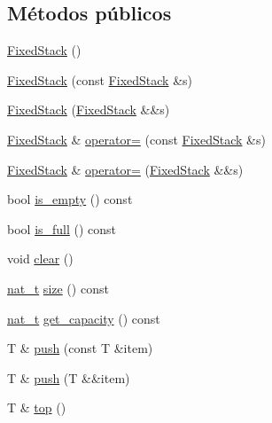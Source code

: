 \subsection*{Métodos públicos}
\begin{DoxyCompactItemize}
\item 
\hyperlink{class_designar_1_1_fixed_stack_a0c590a0c0a634d22c71234023f85dc2e}{Fixed\+Stack} ()
\item 
\hyperlink{class_designar_1_1_fixed_stack_a07e80411f9dbbc5009846ffd9f614b3c}{Fixed\+Stack} (const \hyperlink{class_designar_1_1_fixed_stack}{Fixed\+Stack} \&s)
\item 
\hyperlink{class_designar_1_1_fixed_stack_aa2a2a6d0c92619bc8404c6c0fd5962c7}{Fixed\+Stack} (\hyperlink{class_designar_1_1_fixed_stack}{Fixed\+Stack} \&\&s)
\item 
\hyperlink{class_designar_1_1_fixed_stack}{Fixed\+Stack} \& \hyperlink{class_designar_1_1_fixed_stack_a3176c9be0f7199ed6708b3e0aca9d8a5}{operator=} (const \hyperlink{class_designar_1_1_fixed_stack}{Fixed\+Stack} \&s)
\item 
\hyperlink{class_designar_1_1_fixed_stack}{Fixed\+Stack} \& \hyperlink{class_designar_1_1_fixed_stack_a300a79d1d3821297d058228cb69f2747}{operator=} (\hyperlink{class_designar_1_1_fixed_stack}{Fixed\+Stack} \&\&s)
\item 
bool \hyperlink{class_designar_1_1_fixed_stack_a59e1c93e8653984ac828840111914982}{is\+\_\+empty} () const
\item 
bool \hyperlink{class_designar_1_1_fixed_stack_ab008ea6214d2335d4fd1ac18fa05e0f1}{is\+\_\+full} () const
\item 
void \hyperlink{class_designar_1_1_fixed_stack_a63b4e0110ee9590eba7b2e776159eb17}{clear} ()
\item 
\hyperlink{namespace_designar_aa72662848b9f4815e7bf31a7cf3e33d1}{nat\+\_\+t} \hyperlink{class_designar_1_1_fixed_stack_a89fc7e6df53ecefa9197a63aeb17e1d0}{size} () const
\item 
\hyperlink{namespace_designar_aa72662848b9f4815e7bf31a7cf3e33d1}{nat\+\_\+t} \hyperlink{class_designar_1_1_fixed_stack_a617775aac061d6a003c7e1638e3e82bb}{get\+\_\+capacity} () const
\item 
T \& \hyperlink{class_designar_1_1_fixed_stack_a2c6786c06798604aaa851e0589c7ba75}{push} (const T \&item)
\item 
T \& \hyperlink{class_designar_1_1_fixed_stack_ac41dfc3fd83bc3b0176e37dcfd600f70}{push} (T \&\&item)
\item 
T \& \hyperlink{class_designar_1_1_fixed_stack_ad9ee2070f73351b57f5cb7de74ab6aa7}{top} ()

\end{DoxyCompactItemize}
